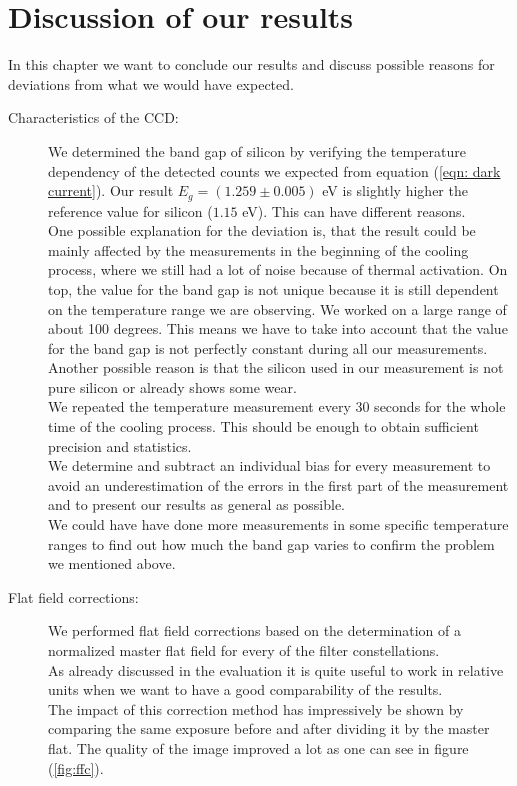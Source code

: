 \chapter{Discussion of our results}
In this chapter we want to conclude our results and discuss possible reasons for deviations from what we would have expected. \\
\begin{description}
	\item[Characteristics of the CCD:] We determined the band gap of silicon by verifying the temperature dependency of the detected counts we expected from equation (\ref{eqn: dark current}). Our result $E_g = (1.259 \pm 0.005)$ eV is slightly higher the reference value for silicon ($1.15$ eV). This can have different reasons. \\ One possible explanation for the deviation is, that the  result could be mainly affected by the  measurements in the beginning  of the cooling process, where we still had a lot of noise because of thermal activation. On top, the value for the band gap is not unique because it is still dependent on the temperature range we are observing. We worked on a large range of about 100 degrees. This means we have to take into account that the value for the band gap is not perfectly constant during all our measurements. \\ Another possible reason is that the silicon  used in our measurement is not pure silicon or  already shows some wear. \\ We repeated the temperature measurement every 30 seconds for the whole time of the cooling process. This should be enough to obtain sufficient precision and statistics. \\
		We determine and subtract an individual bias for every measurement to avoid an underestimation of the errors in the first part of the measurement and to present our results as general as possible. \\
		 We could have have done more measurements in some specific temperature ranges to find out how much the band gap varies to confirm the problem we mentioned above. 
	\item[Flat field corrections:] We performed flat field corrections based on the determination of a normalized master flat field for every of the filter constellations. \\ As already discussed in the evaluation it is quite useful to work in relative units when we want to have a good comparability of the results.\\ The impact of this correction method has impressively be shown by comparing the same exposure before and after dividing it by the master flat. The quality of the image improved a lot as one can see in figure (\ref{fig:ffc}). \\

\end{description}
